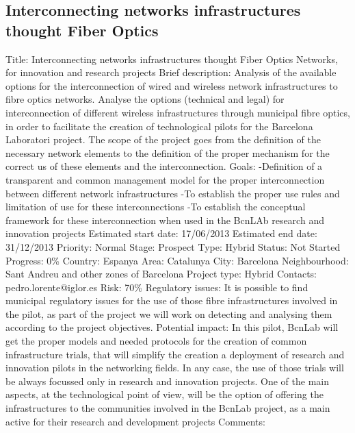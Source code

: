 \documentclass[draftclsnofoot,12pt,journal,onecolumn]{IEEEtran}
\begin{document}
\subsection{Interconnecting networks infrastructures thought Fiber Optics} 
Title: Interconnecting networks infrastructures thought Fiber Optics 
Networks, for innovation and research projects 
Brief description: Analysis of the available options for the interconnection 
of wired and wireless network infrastructures to fibre optics networks. 
Analyse the options (technical and legal) for interconnection of different 
wireless infrastructures through municipal fibre optics, in order to 
facilitate the creation of technological pilots for the Barcelona Laboratori 
project. The scope of the project goes from the definition of the necessary 
network elements to the definition of the proper mechanism for the correct us 
of these elements and the interconnection. 
Goals: 
-Definition of a transparent and common management model for the proper 
interconnection between different network infrastructures 
-To establish the proper use rules and limitation of use for these 
interconnections 
-To establish the conceptual framework for these interconnection when used in 
the BcnLAb research and innovation projects 
Estimated start date: 17/06/2013 
Estimated end date: 31/12/2013 
Priority: Normal 
Stage: Prospect 
Type: Hybrid 
Status: Not Started 
Progress: 0\% 
Country: Espanya 
Area: Catalunya 
City: Barcelona 
Neighbourhood: Sant Andreu and other zones of Barcelona 
Project type: Hybrid 
Contacts: pedro.lorente@iglor.es
Risk: 70\% 
Regulatory issues: It is possible to find municipal regulatory issues for the 
use of those fibre infrastructures involved in the pilot, as part of the 
project we will work on detecting and analysing them according to the project 
objectives. 
Potential impact: 
In this pilot, BcnLab will get the proper models and needed protocols for the 
creation of common infrastructure trials, that will simplify the creation a 
deployment of research and innovation pilots in the networking fields. In any 
case, the use of those trials will be always focussed only in research and 
innovation projects. 
One of the main aspects, at the technological point of view, will be the 
option of offering the infrastructures to the communities involved in the 
BcnLab project, as a main active for their research and development projects 
Comments: 
\end{document}

